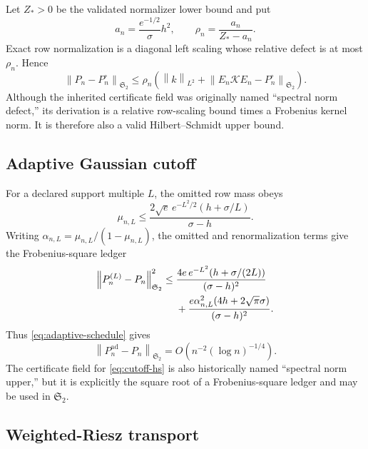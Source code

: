 \documentclass[11pt]{article}
\theoremstyle{definition}
\theoremstyle{remark}
\newcommand{\cK}{\mathcal K}
\newcommand{\norm}[1]{\left\lVert #1\right\rVert}
\begin{document}
Let $Z_*>0$ be the validated normalizer lower bound and put
\begin{equation}
 a_n=\frac{e^{-1/2}}{\sigma}h^2,
 \qquad
 \rho_n=\frac{a_n}{Z_*-a_n}.
 \label{eq:normalization-scaling}
\end{equation}
Exact row normalization is a diagonal left scaling whose relative defect is
at most $\rho_n$.  Hence
\begin{equation}
 \norm{P_n-P_n^\circ}_{\mathfrak S_2}
 \le \rho_n
 \left(\norm k_{L^2}+\norm{E_n\cK E_n-P_n^\circ}_{\mathfrak S_2}\right).
 \label{eq:normalization-hs}
\end{equation}
Although the inherited certificate field was originally named
``spectral norm defect,'' its derivation is a relative row-scaling bound
times a Frobenius kernel norm.  It is therefore also a valid
Hilbert--Schmidt upper bound.

\subsection{Adaptive Gaussian cutoff}

For a declared support multiple $L$, the omitted row mass obeys
\begin{equation}
 \mu_{n,L}
 \le
 \frac{2\sqrt e\,e^{-L^2/2}(h+\sigma/L)}{\sigma-h}.
 \label{eq:cutoff-mass}
\end{equation}
Writing $\alpha_{n,L}=\mu_{n,L}/(1-\mu_{n,L})$, the omitted and
renormalization terms give the Frobenius-square ledger
\begin{align}
 \norm{P_n^{(L)}-P_n}_{\mathfrak S_2}^2
 \le{}&
 \frac{4e\,e^{-L^2}(h+\sigma/(2L))}{(\sigma-h)^2}
 \notag\\
 &+\frac{e\alpha_{n,L}^2(4h+2\sqrt\pi\sigma)}{(\sigma-h)^2}.
 \label{eq:cutoff-hs}
\end{align}
Thus \eqref{eq:adaptive-schedule} gives
\begin{equation}
 \norm{P_n^{\mathrm{ad}}-P_n}_{\mathfrak S_2}
 =O\!\left(n^{-2}(\log n)^{-1/4}\right).
 \label{eq:adaptive-cutoff-rate}
\end{equation}
The certificate field for \eqref{eq:cutoff-hs} is also historically named
``spectral norm upper,'' but it is explicitly the square root of a
Frobenius-square ledger and may be used in $\mathfrak S_2$.

\subsection{Weighted-Riesz transport}
\end{document}
